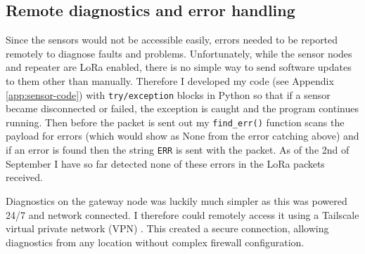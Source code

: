 \subsection{Remote diagnostics and error handling}

Since the sensors would not be accessible easily, errors needed to be reported
remotely to diagnose faults and problems. Unfortunately, while the sensor nodes
and repeater are LoRa enabled, there is no simple way to send software updates
to them other than manually. Therefore I developed my code (see Appendix
\ref{app:sensor-code}) with \texttt{try/exception} blocks in Python so that if a
sensor became disconnected or failed, the exception is caught and the program
continues running. Then before the packet is sent out my \texttt{find\_err()}
function scans the payload for errors (which would show as None from the error
catching above) and if an error is found then the string \texttt{ERR} is sent
with the packet. As of the 2nd of September I have so far detected none of these
errors in the LoRa packets received.

Diagnostics on the gateway node was luckily much simpler as this was powered
24/7 and network connected. I therefore could remotely access it using a
Tailscale virtual private network (VPN) \cite{tailscale_2025}. This created a
secure connection, allowing diagnostics from any location without complex
firewall configuration.